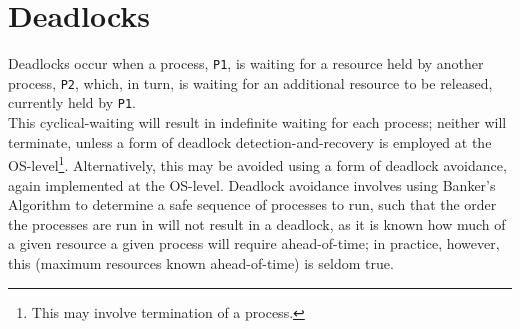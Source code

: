 \section{Deadlocks}
\label{Deadlocks}
Deadlocks occur when a process, \texttt{P1}, is waiting for a resource held by another process, \texttt{P2}, which, in turn, is waiting for an additional resource to be released, currently held by \texttt{P1}.\\
This cyclical-waiting will result in indefinite waiting for each process; neither will terminate, unless a form of deadlock detection-and-recovery is employed at the OS-level\footnote{This may involve termination of a process.}. Alternatively, this may be avoided using a form of deadlock avoidance, again implemented at the OS-level. Deadlock avoidance involves using Banker's Algorithm to determine a safe sequence of processes to run, such that the order the processes are run in will not result in a deadlock, as it is known how much of a given resource a given process will require ahead-of-time; in practice, however, this (maximum resources known ahead-of-time) is seldom true.